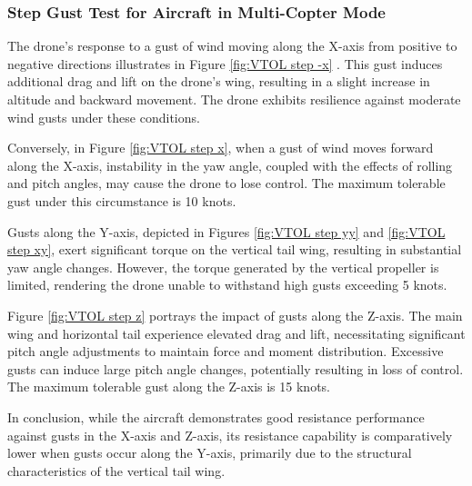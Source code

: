 \subsubsection{Step Gust Test for Aircraft in Multi-Copter Mode}

The drone's response to a gust of wind moving along the X-axis from positive to negative directions illustrates in Figure \ref{fig:VTOL step -x} . This gust induces additional drag and lift on the drone's wing, resulting in a slight increase in altitude and backward movement. The drone exhibits resilience against moderate wind gusts under these conditions.

Conversely, in Figure \ref{fig:VTOL step x}, when a gust of wind moves forward along the X-axis, instability in the yaw angle, coupled with the effects of rolling and pitch angles, may cause the drone to lose control. The maximum tolerable gust under this circumstance is 10 knots.

Gusts along the Y-axis, depicted in Figures \ref{fig:VTOL step yy} and \ref{fig:VTOL step xy}, exert significant torque on the vertical tail wing, resulting in substantial yaw angle changes. However, the torque generated by the vertical propeller is limited, rendering the drone unable to withstand high gusts exceeding 5 knots.

Figure \ref{fig:VTOL step z} portrays the impact of gusts along the Z-axis. The main wing and horizontal tail experience elevated drag and lift, necessitating significant pitch angle adjustments to maintain force and moment distribution. Excessive gusts can induce large pitch angle changes, potentially resulting in loss of control. The maximum tolerable gust along the Z-axis is 15 knots.

In conclusion, while the aircraft demonstrates good resistance performance against gusts in the X-axis and Z-axis, its resistance capability is comparatively lower when gusts occur along the Y-axis, primarily due to the structural characteristics of the vertical tail wing.


